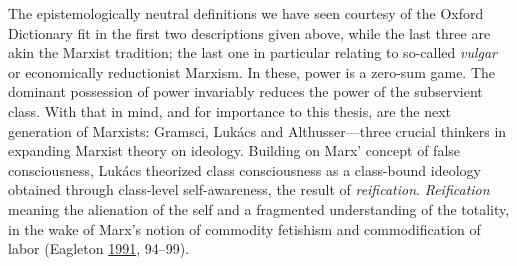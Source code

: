 \documentclass[10pt,british,A4paper,,openany]{memoir}
\begin{document}
The epistemologically neutral definitions we have seen courtesy of the
Oxford Dictionary fit in the first two descriptions given above, while
the last three are akin the Marxist tradition; the last one in
particular relating to so-called \emph{vulgar} or economically
reductionist Marxism. In these, power is a zero-sum game. The dominant
possession of power invariably reduces the power of the subservient
class. With that in mind, and for importance to this thesis, are the
next generation of Marxists: Gramsci, Lukács and Althusser---three
crucial thinkers in expanding Marxist theory on ideology. Building on
Marx' concept of false consciousness, Lukács theorized class
consciousness as a class-bound ideology obtained through class-level
self-awareness, the result of \emph{reification}. \emph{Reification}
meaning the alienation of the self and a fragmented understanding of the
totality, in the wake of Marx's notion of commodity fetishism and
commodification of labor (Eagleton
\protect\hyperlink{ref-eagleton_ideology:_1991}{1991}, 94--99).
\end{document}
